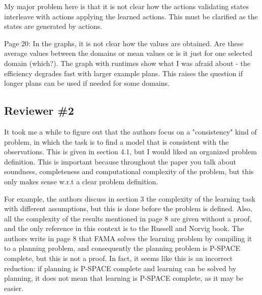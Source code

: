 \documentclass{article}
\begin{document}
\begin{mdframed}[hidealllines=true,backgroundcolor=gray!20]
  My major problem here is that it is not clear how the actions validating states interleave with actions applying the learned actions. This must be clarified as the states are generated by actions.
\end{mdframed}

\begin{mdframed}[hidealllines=true,backgroundcolor=gray!20]
  Page 20: In the graphs, it is not clear how the values are obtained. Are these average values between the domains or mean values or is it just for one selected domain (which?).
  The graph with runtimes show what I was afraid about - the efficiency degrades fast with larger example plans. This raises the question if longer plans can be used if needed for some domains.
\end{mdframed}



\subsection*{Reviewer \#2}

\begin{mdframed}[hidealllines=true,backgroundcolor=gray!20]
  It took me a while to figure out that the authors focus on a "consistency" kind of problem, in which the task is to find a model that is consistent with the observations. This is given in section 4.1, but I would liked an organized problem definition. This is important because throughout the paper you talk about soundness, completeness and computational complexity of the problem, but this only makes sense w.r.t a clear problem definition.

For example, the authors discuss in section 3 the complexity of the learning task with different assumptions, but this is done before the problem is defined. Also, all the complexity of the results mentioned in page 8 are given without a proof, and the only reference in this context is to the Russell and Norvig book. The authors write in page 8 that FAMA solves the learning problem by compiling it to a planning problem, and consequently the planning problem is P-SPACE complete, but this is not a proof. In fact, it seems like this is an incorrect reduction: if planning is P-SPACE complete and learning can be solved by planning, it does not mean that learning is P-SPACE complete, as it may be easier.
\end{mdframed}
\end{document}
